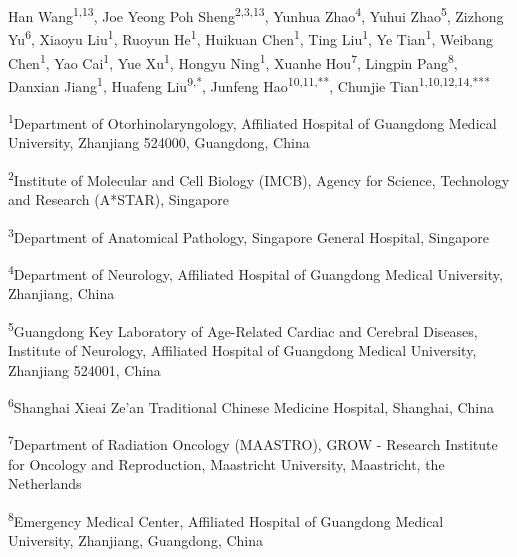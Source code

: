 \thispagestyle{plain}
\begin{singlespace}
\bigskip
\noindent Han Wang\textsuperscript{1,13}, Joe Yeong Poh Sheng\textsuperscript{2,3,13}, Yunhua Zhao\textsuperscript{4}, Yuhui Zhao\textsuperscript{5}, Zizhong Yu\textsuperscript{6}, Xiaoyu Liu\textsuperscript{1}, Ruoyun He\textsuperscript{1}, Huikuan Chen\textsuperscript{1}, Ting Liu\textsuperscript{1}, Ye Tian\textsuperscript{1}, Weibang Chen\textsuperscript{1}, Yao Cai\textsuperscript{1}, Yue Xu\textsuperscript{1}, Hongyu Ning\textsuperscript{1}, Xuanhe Hou\textsuperscript{7}, Lingpin Pang\textsuperscript{8}, Danxian Jiang\textsuperscript{1}, Huafeng Liu\textsuperscript{9,*}, Junfeng Hao\textsuperscript{10,11,**}, Chunjie Tian\textsuperscript{1,10,12,14,***}\par
\medskip
{\small\raggedright
\noindent\textsuperscript{1}Department of Otorhinolaryngology, Affiliated Hospital of Guangdong Medical University, Zhanjiang 524000, Guangdong, China\par\smallskip
\noindent\textsuperscript{2}Institute of Molecular and Cell Biology (IMCB), Agency for Science, Technology and Research (A*STAR), Singapore\par\smallskip
\noindent\textsuperscript{3}Department of Anatomical Pathology, Singapore General Hospital, Singapore\par\smallskip
\noindent\textsuperscript{4}Department of Neurology, Affiliated Hospital of Guangdong Medical University, Zhanjiang, China\par\smallskip
\noindent\textsuperscript{5}Guangdong Key Laboratory of Age-Related Cardiac and Cerebral Diseases, Institute of Neurology, Affiliated Hospital of Guangdong Medical University, Zhanjiang 524001, China\par\smallskip
\noindent\textsuperscript{6}Shanghai Xieai Ze'an Traditional Chinese Medicine Hospital, Shanghai, China\par\smallskip
\noindent\textsuperscript{7}Department of Radiation Oncology (MAASTRO), GROW - Research Institute for Oncology and Reproduction, Maastricht University, Maastricht, the Netherlands\par\smallskip
\noindent\textsuperscript{8}Emergency Medical Center, Affiliated Hospital of Guangdong Medical University, Zhanjiang, Guangdong, China\par\smallskip
}
\end{singlespace}
